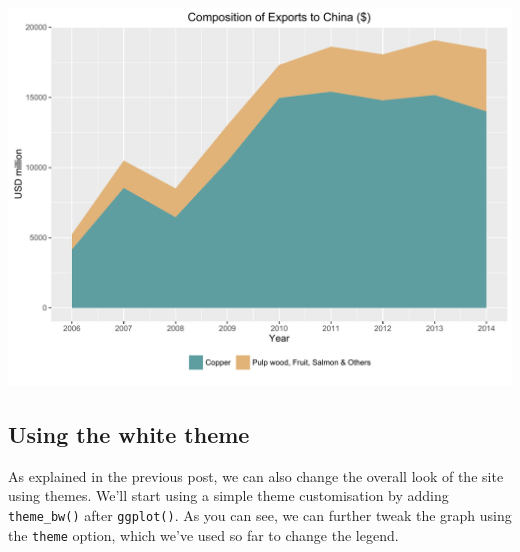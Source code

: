 \documentclass[]{article}
\newenvironment{Shaded}{\begin{snugshade}}{\end{snugshade}}
\newcommand{\KeywordTok}[1]{\textcolor[rgb]{0.13,0.29,0.53}{\textbf{{#1}}}}
\newcommand{\DataTypeTok}[1]{\textcolor[rgb]{0.13,0.29,0.53}{{#1}}}
\newcommand{\StringTok}[1]{\textcolor[rgb]{0.31,0.60,0.02}{{#1}}}
\newcommand{\NormalTok}[1]{{#1}}
\begin{document}
\begin{Shaded}
\end{Shaded}

\begin{center}\includegraphics{0_all_posts_pdf/area_6-1} \end{center}

\subsection{Using the white theme}\label{using-the-white-theme-1}

As explained in the previous post, we can also change the overall look
of the site using themes. We'll start using a simple theme customisation
by adding \texttt{theme\_bw()} after \texttt{ggplot()}. As you can see,
we can further tweak the graph using the \texttt{theme} option, which
we've used so far to change the legend.
\end{document}
